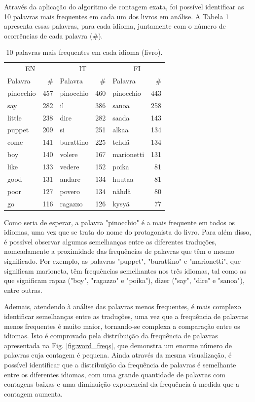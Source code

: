\documentclass[mirror, portugues]{revdetua}
\begin{document}
Através da aplicação do algoritmo de contagem exata, foi possível identificar as 10 palavras mais frequentes em cada um dos livros em análise. A Tabela \ref{table:top10_exatos} apresenta essas palavras, para cada idioma, juntamente com o número de ocorrências de cada palavra (\#).

\begin{table}[H]
\centering
\caption{10 palavras mais frequentes em cada idioma (livro).}
\label{table:top10_exatos}
\begin{tabular}{lr|lr|lr}
\toprule
\multicolumn{2}{c}{EN} & \multicolumn{2}{c}{IT} & \multicolumn{2}{c}{FI} \\
Palavra & \# & Palavra & \# & Palavra & \# \\
\midrule
pinocchio & 457 & pinocchio & 460 & pinocchio & 443 \\
say & 282 & il & 386 & sanoa & 258 \\
little & 238 & dire & 282 & saada & 143 \\
puppet & 209 & si & 251 & alkaa & 134 \\
come & 141 & burattino & 225 & tehdä & 134 \\
boy & 140 & volere & 167 & marionetti & 131 \\
like & 133 & vedere & 152 & poika & 81 \\
good & 131 & andare & 134 & huutaa & 81 \\
poor & 127 & povero & 134 & nähdä & 80 \\
go & 116 & ragazzo & 126 & kysyä & 77 \\
\bottomrule
\end{tabular}
\end{table}

Como seria de esperar, a palavra "pinocchio" é a mais frequente em todos os idiomas, uma vez que se trata do nome do protagonista do livro. Para além disso, é possível observar algumas semelhanças entre as diferentes traduções, nomeadamente a proximidade das frequências de palavras que têm o mesmo significado. Por exemplo, as palavras "puppet", "burattino" e "marionetti", que significam marioneta, têm frequências semelhantes nos três idiomas, tal como as que significam rapaz ("boy", "ragazzo" e "poika"), dizer ("say", "dire" e "sanoa"), entre outras.

Ademais, atendendo à análise das palavras menos frequentes, é mais complexo identificar semelhanças entre as traduções, uma vez que a frequência de palavras menos frequentes é muito maior, tornando-se complexa a comparação entre os idiomas. Isto é comprovado pela distribuição da frequência de palavras apresentada na Fig. \ref{fig:word_freqs}, que demonstra um enorme número de palavras cuja contagem é pequena. Ainda através da mesma visualização, é possível identificar que a distribuição da frequência de palavras é semelhante entre os diferentes idiomas, com uma grande quantidade de palavras com contagens baixas e uma diminuição exponencial da frequência à medida que a contagem aumenta.
\end{document}
